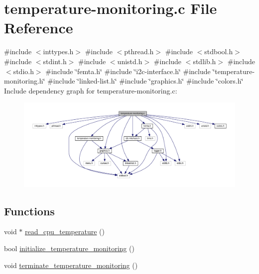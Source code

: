 \hypertarget{temperature-monitoring_8c}{}\section{temperature-\/monitoring.c File Reference}
\label{temperature-monitoring_8c}
{\ttfamily \#include $<$inttypes.\+h$>$}\newline
{\ttfamily \#include $<$pthread.\+h$>$}\newline
{\ttfamily \#include $<$stdbool.\+h$>$}\newline
{\ttfamily \#include $<$stdint.\+h$>$}\newline
{\ttfamily \#include $<$unistd.\+h$>$}\newline
{\ttfamily \#include $<$stdlib.\+h$>$}\newline
{\ttfamily \#include $<$stdio.\+h$>$}\newline
{\ttfamily \#include \char`\"{}femta.\+h\char`\"{}}\newline
{\ttfamily \#include \char`\"{}i2c-\/interface.\+h\char`\"{}}\newline
{\ttfamily \#include \char`\"{}temperature-\/monitoring.\+h\char`\"{}}\newline
{\ttfamily \#include \char`\"{}linked-\/list.\+h\char`\"{}}\newline
{\ttfamily \#include \char`\"{}graphics.\+h\char`\"{}}\newline
{\ttfamily \#include \char`\"{}colors.\+h\char`\"{}}\newline
Include dependency graph for temperature-\/monitoring.c\+:\nopagebreak
\begin{figure}[H]
\begin{center}
\leavevmode
\includegraphics[width=350pt]{temperature-monitoring_8c__incl}
\end{center}
\end{figure}
\subsection*{Functions}
\begin{DoxyCompactItemize}
\item 
void $\ast$ \hyperlink{temperature-monitoring_8c_a6a33eb327dd6b9aac62b32cf7220cca0}{read\+\_\+cpu\+\_\+temperature} ()
\item 
bool \hyperlink{temperature-monitoring_8c_a1d2bab81a3e6aa84eb0c2e0172594299}{initialize\+\_\+temperature\+\_\+monitoring} ()
\item 
void \hyperlink{temperature-monitoring_8c_a8b1be00dadac2a3d808233430fb2cf8b}{terminate\+\_\+temperature\+\_\+monitoring} ()
\end{DoxyCompactItemize}
